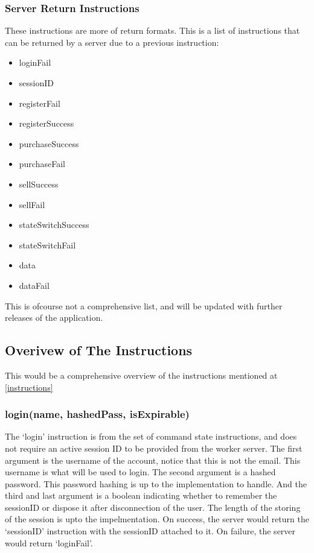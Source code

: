\documentclass[a4paper]{article}
\begin{document}
\subsubsection{Server Return Instructions}
These instructions are more of return formats. This is a list of instructions 
that can be returned by a server due to a previous instruction:
\begin{itemize}
	\item loginFail
	\item sessionID
	\item registerFail
	\item registerSuccess
	\item purchaseSuccess
	\item purchaseFail
	\item sellSuccess
	\item sellFail
	\item stateSwitchSuccess
	\item stateSwitchFail
	\item data
	\item dataFail
\end{itemize}

This is ofcourse not a comprehensive list, and will be updated with further
releases of the application.

\subsection{Overivew of The Instructions}
This would be a comprehensive overview of the instructions mentioned at
\ref{instructions} 

\subsubsection{login(name, hashedPass, isExpirable)}
The `login' instruction is from the set of command state instructions, and does
not require an active session ID to be provided from the worker server. The
first argument is the username of the account, notice that this is not the
email. This username is what will be used to login. The second argument is a
hashed password. This password hashing is up to the implementation to handle.
And the third and last argument is a boolean indicating whether to remember the
sessionID or dispose it after disconnection of the user. The length of the
storing of the session is upto the impelmentation. On success, the server would
return the `sessionID' instruction with the sessionID attached to it. On 
failure, the server would return `loginFail'.
\end{document}
